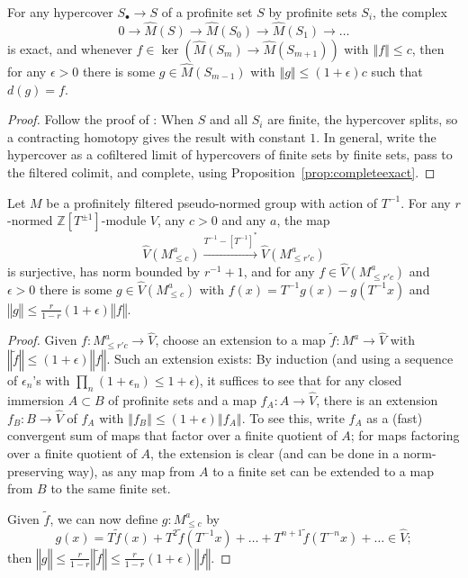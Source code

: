 \begin{proposition}
  \label{hypercover-exact}
For any hypercover $S_\bullet\to S$ of a profinite set $S$ by profinite sets $S_i$, the complex
\[
0\to \widehat{M}(S)\to \widehat{M}(S_0)\to \widehat{M}(S_1)\to \ldots
\]
is exact, and whenever $f\in \ker(\widehat{M}(S_m)\to \widehat{M}(S_{m+1}))$ with $‖f‖\leq c$, then for any $\epsilon>0$ there is some $g\in \widehat{M}(S_{m-1})$ with $‖g‖\leq (1+\epsilon)c$ such that $d(g)=f$.
\end{proposition}

\begin{proof}
Follow the proof of \cite[Theorem 3.3]{Condensed}: When $S$ and all $S_i$ are finite, the hypercover splits, so a contracting homotopy gives the result with constant $1$. In general, write the hypercover as a cofiltered limit of hypercovers of finite sets by finite sets, pass to the filtered colimit, and complete, using Proposition~\ref{prop:completeexact}.
\end{proof}

\begin{lemma}
  \label{lem:Tinv}
  Let $M$ be a profinitely filtered pseudo-normed group with action of $T^{-1}$.
  For any $r$-normed $\mathbb Z[T^{\pm 1}]$-module $V$, any $c>0$ and any $a$, the map
\[
\widehat{V}(M_{\leq c}^a)\xrightarrow{T^{-1}-[T^{-1}]^\ast} \widehat{V}(M_{\leq r'c}^a)
\]
is surjective, has norm bounded by $r^{-1}+1$, and for any $f\in \widehat{V}(M_{\leq r'c}^a)$ and $\epsilon>0$ there is some $g\in \widehat{V}(M_{\leq c}^a)$ with $f(x)=T^{-1}g(x)-g(T^{-1}x)$ and $‖g‖\leq \frac{r}{1-r}(1+\epsilon) ‖f‖$.
\end{lemma}

\begin{proof} Given $f: M_{\leq r'c}^a\to \widehat{V}$, choose an extension to a map $\tilde{f}: M^a\to \widehat{V}$ with $‖\tilde{f}‖\leq (1+\epsilon)‖f‖$. Such an extension exists: By induction (and using a sequence of $\epsilon_n$'s with $\prod_n (1+\epsilon_n)\leq 1+\epsilon$), it suffices to see that for any closed immersion $A\subset B$ of profinite sets and a map $f_A: A\to \widehat{V}$, there is an extension $f_B: B\to \widehat{V}$ of $f_A$ with $‖f_B‖\leq (1+\epsilon)‖f_A‖$. To see this, write $f_A$ as a (fast) convergent sum of maps that factor over a finite quotient of $A$; for maps factoring over a finite quotient of $A$, the extension is clear (and can be done in a norm-preserving way), as any map from $A$ to a finite set can be extended to a map from $B$ to the same finite set.

Given $\tilde{f}$, we can now define $g: M_{\leq c}^a$ by
\[
g(x) = T\tilde{f}(x)+T^2\tilde{f}(T^{-1}x)+\ldots+T^{n+1}\tilde{f}(T^{-n}x)+\ldots\in \widehat{V};
\]
then $‖g‖\leq \frac r{1-r}‖\tilde{f}‖\leq \frac r{1-r}(1+\epsilon)‖f‖$.
\end{proof}

